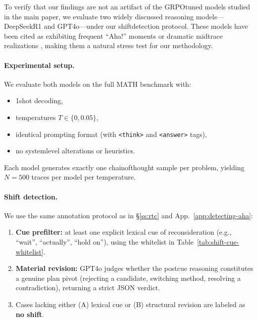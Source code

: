 To verify that our findings are not an artifact of the GRPO\textendash tuned models studied in the main paper, we evaluate two widely discussed reasoning models---DeepSeek\textendash R1 and GPT\textendash 4o---under our shift\textendash detection protocol. These models have been cited as exhibiting frequent ``Aha!'' moments or dramatic mid\textendash trace realizations \citep{deepseekai2025deepseekr1incentivizingreasoningcapability}, making them a natural stress test for our methodology.

\paragraph{Experimental setup.}
We evaluate both models on the full \textsc{MATH} benchmark with:
\begin{itemize}[leftmargin=*]
    \item 1\textendash shot decoding,
    \item temperatures $T\in\{0, 0.05\}$,
    \item identical prompting format (with \texttt{<think>} and \texttt{<answer>} tags),
    \item no system\textendash level alterations or heuristics.
\end{itemize}
Each model generates exactly one chain\textendash of\textendash thought sample per problem, yielding $N{=}500$ traces per model per temperature.

\paragraph{Shift detection.}
We use the same annotation protocol as in \S\ref{ss:rtc} and App.~\ref{app:detecting-aha}:
\begin{enumerate}[leftmargin=*]
    \item \textbf{Cue prefilter:} at least one explicit lexical cue of reconsideration (e.g., ``wait'', ``actually'', ``hold on''), using the whitelist in Table~\ref{tab:shift-cue-whitelist}.
    \item \textbf{Material revision:} GPT\textendash 4o judges whether the post\textendash cue reasoning constitutes a genuine plan pivot (rejecting a candidate, switching method, resolving a contradiction), returning a strict JSON verdict.
    \item Cases lacking either (A) lexical cue or (B) structural revision are labeled as \textbf{no shift}.
\end{enumerate}

